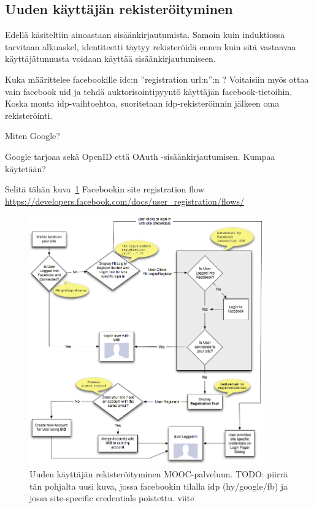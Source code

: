 \documentclass[finnish,gradu]{tktltiki}
\begin{document}


  \subsection{Uuden käyttäjän rekisteröityminen} %
  \label{sub:uuden_käyttäjän_rekisteröityminen}

  Edellä käsiteltiin ainoastaan sisäänkirjautumista. Samoin kuin induktiossa tarvitaan alkuaskel, identiteetti täytyy rekisteröidä ennen kuin sitä vastaavaa käyttäjätunnusta voidaan käyttää sisäänkirjautumiseen.

  Kuka määrittelee facebookille idc:n ''registration url:n'':n ? Voitaisiin myös ottaa vain facebook uid ja tehdä auktorisointipyyntö käyttäjän facebook-tietoihin. Koska monta idp-vaihtoehtoa, suoritetaan idp-rekisteröinnin jälkeen oma rekisteröinti.

  Miten Google?

  Google tarjoaa sekä OpenID että OAuth -sisäänkirjautumisen. Kumpaa käytetään?

  Selitä tähän kuva~\ref{fig:registration_with_facebook} Facebookin site registration flow \url{https://developers.facebook.com/docs/user_registration/flows/}

  \begin{figure}
    \centering
    \includegraphics[width=0.9\textwidth]{images/facebook_user_registretion.png}
    \caption{Uuden käyttäjän rekisteröityminen MOOC-palveluun. TODO: piirrä tän pohjalta uusi kuva, jossa facebookin tilalla idp (hy/google/fb) ja jossa site-specific credentials poistettu. viite }
    \label{fig:registration_with_facebook}
  \end{figure}
\end{document}
